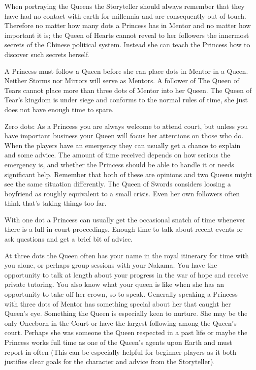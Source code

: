 When portraying the Queens the Storyteller should always remember that they have had no contact with earth for millennia and are consequently out of touch. Therefore no matter how many dots a Princess has in Mentor and no matter how important it is; the Queen of Hearts cannot reveal to her followers the innermost secrets of the Chinese political system. Instead she can teach the Princess how to discover such secrets herself.

A Princess must follow a Queen before she can place dots in Mentor in a Queen. Neither Storms nor Mirrors will serve as Mentors. A follower of The Queen of Tears cannot place more than three dots of Mentor into her Queen. The Queen of Tear's kingdom is under siege and conforms to the normal rules of time, she just does not have enough time to spare.

Zero dots: As a Princess you are always welcome to attend court, but unless you have important business your Queen will focus her attentions on those who do. When the players have an emergency they can usually get a chance to explain and some advice. The amount of time received depends on how serious the emergency is, and whether the Princess should be able to handle it or needs significant help. Remember that both of these are opinions and two Queens might see the same situation differently. The Queen of Swords considers loosing a boyfriend as roughly equivalent to a small crisis. Even her own followers often think that's taking things too far.

With one dot a Princess can usually get the occasional snatch of time whenever there is a lull in court proceedings. Enough time to talk about recent events or ask questions and get a brief bit of advice.

At three dots the Queen often has your name in the royal itinerary for time with you alone, or perhaps group sessions with your Nakama. You have the opportunity to talk at length about your progress in the war of hope and receive private tutoring. You also know what your queen is like when she has an opportunity to take off her crown, so to speak. Generally speaking a Princess with three dots of Mentor has something special about her that caught her Queen's eye. Something the Queen is especially keen to nurture. She may be the only Onceborn in the Court or have the largest following among the Queen's court. Perhaps she was someone the Queen respected in a past life or maybe the Princess works full time as one of the Queen's agents upon Earth and must report in often (This can be especially helpful for beginner players as it both justifies clear goals for the character and advice from the Storyteller).

